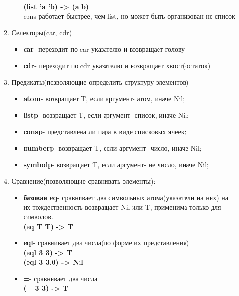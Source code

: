 \begin{enumerate}
\begin{enumerate}
\begin{itemize}
                        \\ \textbf{(list 'a 'b) -> (a b)}
                    \\
                    cons работает быстрее, чем list, но может быть организован не список
                \end{itemize}
            \item Селекторы(car, cdr)
                \begin{itemize}
                    \item \textbf{car}- переходит по car указателю и возвращает голову
                    \item \textbf{cdr}- переходит по cdr указателю и возвращает хвост(остаток)
                \end{itemize}
            \item Предикаты(позволяющие определить структуру элементов)
                \begin{itemize}
                    \item \textbf{atom}- возвращает T, если аргумент- атом, иначе Nil;
                    \item \textbf{listp}-  возвращает T, если аргумент- список, иначе Nil;
                    \item \textbf{consp}- представлена ли пара в виде списковых ячеек;
                    \item \textbf{numberp}- возвращает T, если аргумент- число, иначе Nil;
                    \item \textbf{symbolp}- возвращает T, если аргумент- не число, иначе Nil;
                \end{itemize}
            \item Сравнение(позволяющие сравнивать элементы):
                \begin{itemize}
                    \item \textbf{базовая eq}- сравнивает два символьных атома(указатели на них) на их тождественность возвращает Nil или T, применима только для символов.
                        \\ \textbf{(eq T T) -> T}
                    \item \textbf{eql}- сравнивает два числа(по форме их представления)
                        \\ \textbf{(eql 3 3) -> T}
                        \\ \textbf{(eql 3 3.0) -> Nil}
                    \item \textbf{=}- сравнивает два числа
                        \\ \textbf{(= 3 3) -> T}

\end{itemize}
\end{enumerate}
\end{enumerate}
